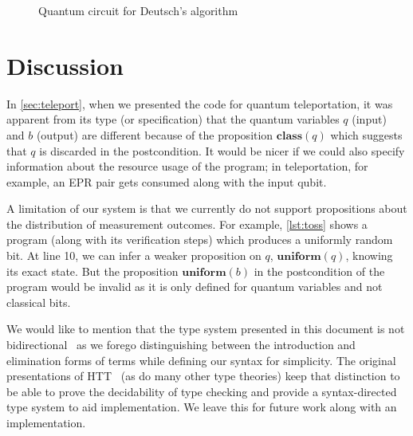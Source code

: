 \documentclass[adraft,creativecommons]{eptcs}
\theoremstyle{definition}
\theoremstyle{remark}
\begin{document}
\begin{figure}[b]
    \centering
    \caption{Quantum circuit for Deutsch's algorithm}
    \label{fig:deutsch}
\end{figure}

\section{Discussion}

In \cref{sec:teleport}, when we presented the code for quantum teleportation, it was apparent from its type (or specification) that the quantum variables $q$ (input) and $b$ (output) are different because of the proposition $\mathbf{class}(q)$ which suggests that $q$ is discarded in the postcondition. It would be nicer if we could also specify information about the resource usage of the program; in teleportation, for example, an EPR pair gets consumed along with the input qubit.

A limitation of our system is that we currently do not support propositions about the distribution of measurement outcomes. For example, \cref{lst:toss} shows a program (along with its verification steps) which produces a uniformly random bit. At line 10, we can infer a weaker proposition on $q$, $\textbf{uniform}(q)$, knowing its exact state. But the proposition $\textbf{uniform}(b)$ in the postcondition of the program would be invalid as it is only defined for quantum variables and not classical bits.



We would like to mention that the type system presented in this document is not bidirectional~\parencite{dunfield2019bidirectional} as we forego distinguishing between the introduction and elimination forms of terms while defining our syntax for simplicity. The original presentations of HTT~\parencite{nanevski2008,abspr07} (as do many other type theories) keep that distinction to be able to prove the decidability of type checking and provide a syntax-directed type system to aid implementation. We leave this for future work along with an implementation.
\end{document}

